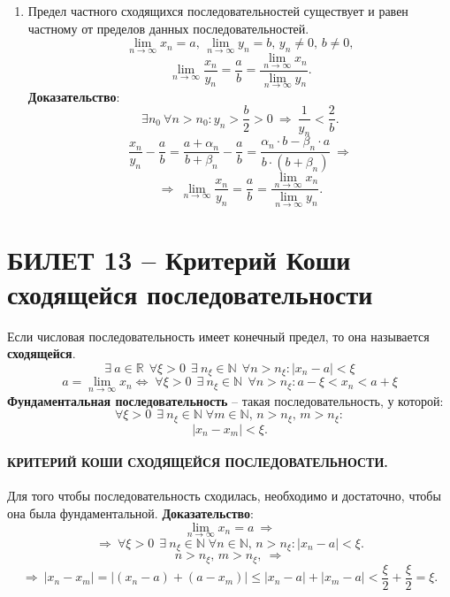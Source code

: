 \documentclass{article}
\newcommand{\numberset}[1]{\mathbb{#1}}
\newcommand{\N}{\numberset{N}}
\newcommand{\R}{\mathbb R}
\begin{document}
\begin{enumerate}
    \newpage
    \item Предел частного сходящихся последовательностей существует и равен частному от пределов данных последовательностей.
    $$ \lim_{n\to\infty} x_{n}=a,\,\lim_{n\to\infty}y_{n}=b,\,y_{n}\ne 0,\,b\ne 0, $$
    $$ \lim_{n\to\infty}\frac{x_{n}}{y_{n}}=\frac{a}{b}=\frac{\lim_{n\to\infty}x_{n}}{\lim_{n\to\infty}y_{n}}. $$
    \textbf{Доказательство}:
    $$ \exists n_{0}\:\forall n>n_{0}:y_{n}>\frac{b}{2}>0\:\Rightarrow\:\frac{1}{y_{n}}<\frac{2}{b}. $$
    $$ \frac{x_{n}}{y_{n}}-\frac{a}{b}=\frac{a+\alpha_{n}}{b+\beta_{n}}-\frac{a}{b}=\frac{\alpha_{n}\cdot b-\beta_{n}\cdot a}{b\cdot(b+\beta_{n})}\:\Rightarrow $$
    $$ \Rightarrow\:\lim_{n\to\infty}\frac{x_{n}}{y_{n}}=\frac{a}{b}=\frac{\lim_{n\to\infty}x_{n}}{\lim_{n\to\infty}y_{n}}. $$
\end{enumerate}
\newpage
\section{БИЛЕТ 13 -- Критерий Коши сходящейся последовательности}
Если числовая последовательность имеет конечный предел, то она называется \textbf{сходящейся}.
$$\exists \: a \in \R \:\: \forall \xi > 0 \:\: \exists \: n_{\xi} \in \N \:\: \forall n > n_{\xi} : |x_{n} - a|<\xi$$
$$ a=\lim_{n\to\infty} x_{n} \Leftrightarrow \; \forall \xi > 0 \:\:\exists \: n_{\xi} \in\N \:\:\forall n>n_{\xi} : a-\xi<x_{n}<a+\xi $$
\textbf{Фундаментальная последовательность} -- такая последовательность, у которой:
$$ \forall\xi>0\:\:\exists\: n_{\xi}\in\N\;\forall m\in\N,\,n>n_{\xi},\,m>n_{\xi}: $$
$$ |x_{n}-x_{m}|<\xi. $$
\paragraph{КРИТЕРИЙ КОШИ СХОДЯЩЕЙСЯ ПОСЛЕДОВАТЕЛЬНОСТИ.}
Для того чтобы последовательность сходилась, необходимо и достаточно, чтобы она была фундаментальной.
\newline
\newline
\textbf{Доказательство}:
$$ \lim_{n\to\infty}x_{n}=a\:\Rightarrow $$
    $$ \Rightarrow\:\forall\xi>0\:\:\exists\: n_{\xi}\in\N\;\forall n\in\N,\, n>n_{\xi}:|x_{n}-a|<\xi. $$
    $$n>n_{\xi},\,m>n_{\xi},\:\Rightarrow$$
    $$ \Rightarrow\:|x_{n}-x_{m}|=|(x_{n}-a)+(a-x_{m})|\leqslant|x_{n}-a|+|x_{m}-a|<\frac{\xi}{2}+\frac{\xi}{2}=\xi. $$
\newpage
\end{document}
